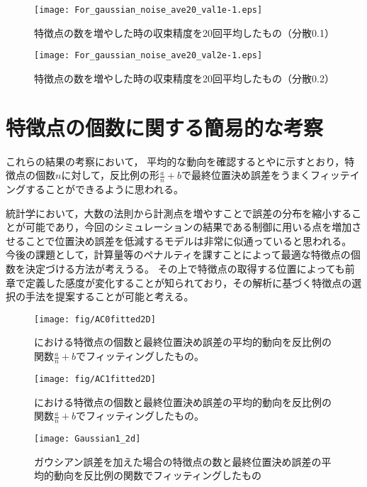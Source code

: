 \documentclass[fleqn]{jreport}
\begin{document}
\begin{figure}[!t]
	\centering
	\texttt{[image: For\_gaussian\_noise\_ave20\_val1e-1.eps]}
	\caption{特徴点の数を増やした時の収束精度を20回平均したもの（分散0.1）}
	\texttt{[image: For\_gaussian\_noise\_ave20\_val2e-1.eps]}
	\caption{特徴点の数を増やした時の収束精度を20回平均したもの（分散0.2）}
\end{figure}

\section{特徴点の個数に関する簡易的な考察}
これらの結果の考察において，
平均的な動向を確認するとやに示すとおり，特徴点の個数$n$に対して，反比例の形$\frac{a}{n}+b$で最終位置決め誤差をうまくフィッテイングすることができるように思われる。

統計学において，大数の法則から計測点を増やすことで誤差の分布を縮小することが可能であり，今回のシミュレーションの結果である制御に用いる点を増加させることで位置決め誤差を低減するモデルは非常に似通っていると思われる。
今後の課題として，計算量等のペナルティを課すことによって最適な特徴点の個数を決定づける方法が考えうる。
その上で特徴点の取得する位置によっても前章で定義した感度が変化することが知られており，その解析に基づく特徴点の選択の手法を提案することが可能と考える。


\begin{figure}[t]
	\centering
	\texttt{[image: fig/AC0fitted2D]}
	\caption{における特徴点の個数と最終位置決め誤差の平均的動向を反比例の関数$\frac{a}{n}+b$でフィッティングしたもの。}
	\label{fig:ac0fitted2d}
\end{figure}


\begin{figure}[t]
	\centering
	\texttt{[image: fig/AC1fitted2D]}
	\caption{における特徴点の個数と最終位置決め誤差の平均的動向を反比例の関数$\frac{a}{n}+b$でフィッティングしたもの。}
	\label{fig:ac0fitted2d}
\end{figure}


\begin{figure}[t]
	\centering
	\texttt{[image: Gaussian1\_2d]}
	\caption{ガウシアン誤差を加えた場合の特徴点の数と最終位置決め誤差の平均的動向を反比例の関数でフィッティングしたもの}
	\label{fig:gaussian12d}
\end{figure}

\end{document}
